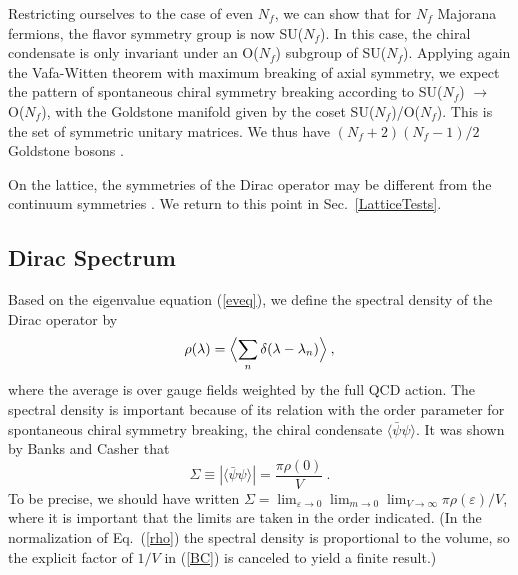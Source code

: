 Restricting ourselves to the case of even $N_f$, we can show that for
$N_f$ Majorana fermions, the
flavor symmetry group is now SU($N_f$). In this case, the chiral
condensate is only invariant under an O($N_f$) subgroup of SU($N_f$).
Applying again the Vafa-Witten theorem with maximum breaking of axial
symmetry, we expect the pattern of spontaneous chiral symmetry
breaking according to SU($N_f$) $\to$ O($N_f$), with the Goldstone
manifold given by the coset SU($N_f$)/O($N_f$). This is the set of
symmetric unitary matrices.  We thus have $(N_f+2)(N_f-1)/2$ Goldstone
bosons \cite{SmV,Toub99}.

On the lattice, the symmetries of the Dirac operator may be different
from the continuum symmetries \cite{Teper}.  We return to this
point in Sec.~\ref{LatticeTests}.

\subsection{Dirac Spectrum}
\label{diracspectrum}

Based on the eigenvalue equation (\ref{eveq}), we define the spectral
density of the Dirac operator by
\begin{equation}
  \label{rho}
  \rho(\lambda)=\Bigl\langle\sum_n\delta(\lambda-\lambda_n)
  \Bigr\rangle\:,
\end{equation}
where the average is over gauge fields weighted by the full QCD
action.  The spectral density is important because of its relation with
the order parameter for spontaneous chiral symmetry breaking, the
chiral condensate $\langle\bar\psi\psi\rangle$.  It was shown by Banks
and Casher \cite{Bank80} that
\begin{equation}
  \label{BC}
  \Sigma\equiv|\langle\bar\psi\psi\rangle|=
  \frac{\pi\rho(0)}{V}\:.
\end{equation}
To be precise, we should have written $\Sigma =
\lim_{\varepsilon\to0} \lim_{m\to0} \lim_{V\to\infty} \pi
\rho(\varepsilon)/V$, 
where it is important that the limits are taken in the order
indicated.  (In the normalization of Eq.~(\ref{rho}) the spectral
density is proportional to the volume, so the explicit factor of
$1/V$ in (\ref{BC}) is canceled to yield a finite result.)

